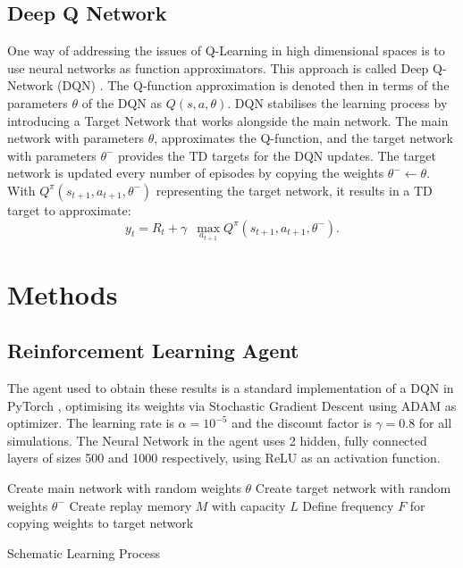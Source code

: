 \documentclass[a4paper, conference]{IEEEtran}
\begin{document}
\subsection{Deep Q Network}
One way of addressing the issues of Q-Learning in high dimensional spaces is to use neural networks as function approximators. This approach is called Deep Q-Network (DQN) \cite{mnih2015}.
The Q-function approximation is denoted then in terms of the parameters $\theta$ of the DQN as $Q(s,a,\theta)$.
DQN stabilises the learning process by introducing a Target Network that works alongside the main network. 
The main network with parameters $\theta$, approximates the Q-function, and the target network with parameters $\theta^-$  provides the TD targets for the DQN updates. 
The target network is updated every number of episodes by copying the weights $\theta^- \leftarrow \theta$. With $Q^{\pi} (s_{t+1}, a_{t+1}, \theta^-)$ representing the target network, it results in a TD target to approximate:
\begin{equation}
y_t = R_t + \gamma \,\,\, \max_{a_{t+1}} Q^{\pi} (s_{t+1}, a_{t+1}, \theta^-).
\end{equation}
\section{Methods}
\label{methods}
\subsection{Reinforcement Learning Agent}
The agent used to obtain these results is a standard implementation of a DQN in PyTorch \cite{pytorch}, optimising its weights via Stochastic Gradient Descent \cite{kiefer} using ADAM \cite{adam} as optimizer.
The learning rate is $\alpha=10^{-5}$ and the discount factor is $\gamma = 0.8$ for all simulations.
The Neural Network in the agent uses 2 hidden, fully connected layers of sizes 500 and 1000 respectively, using ReLU as an activation function.
\begin{algorithm}
\SetAlgoLined
 Create main network with random weights $\theta$\;
 Create target network with random weights $\theta^-$\;
 Create replay memory $M$ with capacity $L$\;
 Define frequency $F$ for copying weights to target network\;
 \caption{Schematic Learning Process}

\end{algorithm}
\end{document}
